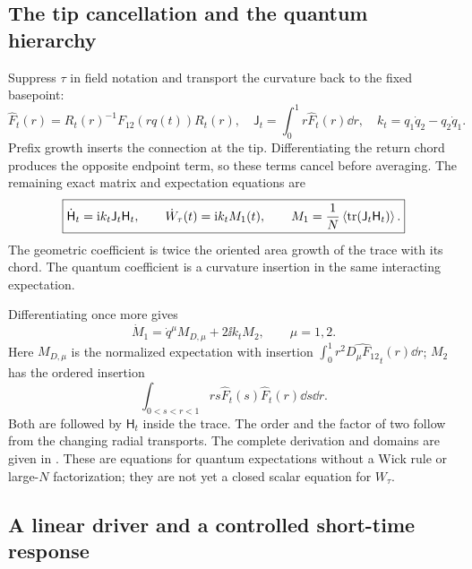 \subsection{The tip cancellation and the quantum hierarchy}

Suppress $\tau$ in field notation and transport the curvature
back to the fixed basepoint:
\begin{equation}\label{eq:main-trace-moment}
 \widehat F_t(r)=R_t(r)^{-1}F_{12}(r q(t))R_t(r),\quad
 \mathsf J_t=\int_0^1r\widehat F_t(r)\dd r,\quad
 k_t=q_1\dot q_2-q_2\dot q_1.
\end{equation}
Prefix growth inserts the connection at the tip. Differentiating
the return chord produces the opposite endpoint term, so these
terms cancel before averaging. The remaining exact matrix and
expectation equations are
\begin{equation}\label{eq:main-trace-flow}
 \boxed{\dot{\mathsf H}_t=\mathrm i k_t\mathsf J_t\mathsf H_t,
 \qquad \dot W_\tau(t)=\mathrm i k_t M_1(t),\qquad
 M_1=\frac1N\left\langle\operatorname{tr}(\mathsf J_t\mathsf H_t)\right\rangle.}
\end{equation}
The geometric coefficient is twice the oriented area growth of
the trace with its chord. The quantum coefficient is a curvature
insertion in the same interacting expectation.

Differentiating once more gives
\begin{equation}\label{eq:main-trace-second}
 \dot M_1=\dot q^\mu M_{D,\mu}+2\ii k_t M_2,
 \qquad \mu=1,2.
\end{equation}
Here $M_{D,\mu}$ is the normalized expectation with insertion
$\int_0^1r^2\widehat{D_\mu F_{12}}_t(r)\dd r$; $M_2$ has the
ordered insertion
\[
 \int_{0<s<r<1}rs\widehat F_t(s)\widehat F_t(r)\dd s\dd r.
\]
Both are followed by $\mathsf H_t$ inside the trace. The order and
the factor of two follow from the changing radial transports.
The complete derivation and domains are given in
\cite[Section~S13]{Supplement}. These are equations for quantum
expectations without a Wick rule or large-$N$ factorization;
they are not yet a closed scalar equation for $W_\tau$.

\subsection{A linear driver and a controlled short-time response}

